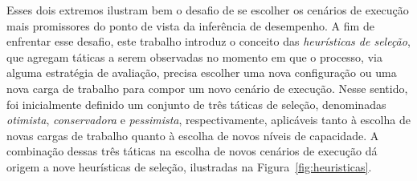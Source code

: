 \documentclass[12pt]{article}
\begin{document}
Esses dois extremos ilustram bem o desafio de se escolher os cenários de execução mais promissores do ponto de vista da inferência de desempenho. A fim de enfrentar esse desafio, este trabalho introduz o conceito das {\em heurísticas de seleção}, que agregam táticas a serem observadas no momento em que o processo, via alguma estratégia de avaliação, precisa escolher uma nova configuração ou uma nova carga de trabalho para compor um novo cenário de execução. Nesse sentido, foi inicialmente definido um conjunto de três táticas de seleção, denominadas {\em otimista}, {\em conservadora} e {\em pessimista}, respectivamente, aplicáveis tanto à escolha de novas cargas de trabalho quanto à escolha de novos níveis de capacidade. A combinação dessas três táticas na escolha de novos cenários de execução dá origem a nove heurísticas de seleção, ilustradas na Figura~\ref{fig:heuristicas}.
\end{document}
